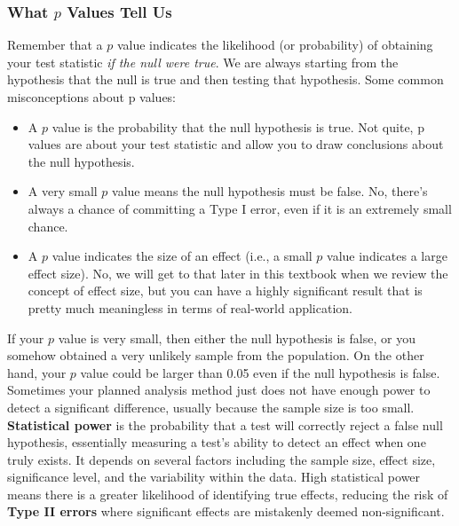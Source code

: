 \documentclass[
  letterpaper,
  DIV=11,
  numbers=noendperiod]{scrreprt}
\begin{document}
\subsubsection*{\texorpdfstring{What \(p\) Values Tell
Us}{What p Values Tell Us}}\label{what-p-values-tell-us}

Remember that a \(p\) value indicates the likelihood (or probability) of
obtaining your test statistic \emph{if the null were true}. We are
always starting from the hypothesis that the null is true and then
testing that hypothesis. Some common misconceptions about p values:

\begin{itemize}
\item
  A \(p\) value is the probability that the null hypothesis is true. Not
  quite, p values are about your test statistic and allow you to draw
  conclusions about the null hypothesis.
\item
  A very small \(p\) value means the null hypothesis must be false. No,
  there's always a chance of committing a Type I error, even if it is an
  extremely small chance.
\item
  A \(p\) value indicates the size of an effect (i.e., a small \(p\)
  value indicates a large effect size). No, we will get to that later in
  this textbook when we review the concept of effect size, but you can
  have a highly significant result that is pretty much meaningless in
  terms of real-world application.
\end{itemize}

If your \(p\) value is very small, then either the null hypothesis is
false, or you somehow obtained a very unlikely sample from the
population. On the other hand, your \(p\) value could be larger than
0.05 even if the null hypothesis is false. Sometimes your planned
analysis method just does not have enough power to detect a significant
difference, usually because the sample size is too small.
\textbf{Statistical power} is the probability that a test will correctly
reject a false null hypothesis, essentially measuring a test's ability
to detect an effect when one truly exists. It depends on several factors
including the sample size, effect size, significance level, and the
variability within the data. High statistical power means there is a
greater likelihood of identifying true effects, reducing the risk of
\textbf{Type II errors} where significant effects are mistakenly deemed
non-significant.
\end{document}
